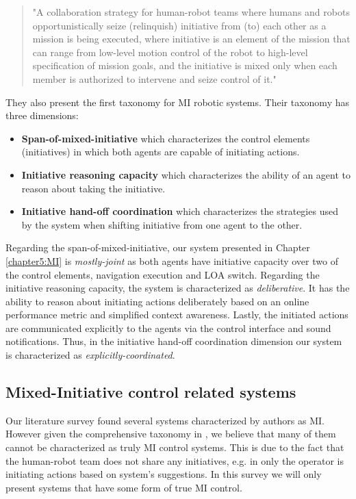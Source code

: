 \documentclass[a4paper,12pt,oneside,openright]{bhamthesis}
\begin{document}
\begin{quotation}
	"A collaboration strategy for human-robot teams where humans and robots opportunistically seize (relinquish) initiative from (to) each other as a mission is being executed, where initiative is an element of the mission that can range from low-level motion control of the robot to high-level specification of mission goals, and the initiative is mixed only when each member is authorized to intervene and seize control of it."
\end{quotation}

They also present the first taxonomy for MI robotic systems. Their taxonomy has three dimensions: 

\begin{itemize}
	\item \textbf{Span-of-mixed-initiative} which characterizes the control elements (initiatives) in which both agents are capable of initiating actions.
	
	\item \textbf{Initiative reasoning capacity} which characterizes the ability of an agent to reason about taking the initiative.
	
	\item \textbf{Initiative hand-off coordination} which characterizes the strategies used by the system when shifting initiative from one agent to the other.
\end{itemize}

Regarding the span-of-mixed-initiative, our system presented in Chapter \ref{chapter5:MI} is \textit{mostly-joint} as both agents have initiative capacity over two of the control elements, navigation execution and LOA switch. Regarding the initiative reasoning capacity, the system is characterized as \textit{deliberative}. It has the ability to reason about initiating actions deliberately based on an online performance metric and simplified context awareness. Lastly, the initiated actions are communicated explicitly to the agents via the control interface and sound notifications. Thus, in the initiative hand-off coordination dimension our system is characterized as \textit{explicitly-coordinated}.

\subsection{Mixed-Initiative control related systems}
\label{section:MI-systems}
Our literature survey found several systems characterized by authors as MI. However given the comprehensive taxonomy in \citep{Jiang2015}, we believe that many of them cannot be characterized as truly MI control systems. This is due to the fact that the human-robot team does not share any initiatives, e.g. in \citep{Finzi2005} only the operator is initiating actions based on system's suggestions. In this survey we will only present systems that have some form of true MI control.
\end{document}
